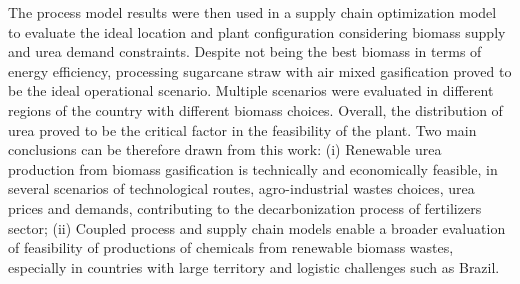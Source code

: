 \documentclass[a4paper, titlepage]{article}
\begin{document}
The process model results were then used in a supply chain optimization model to evaluate the ideal location and plant
configuration considering biomass supply and urea demand constraints. Despite not being the best biomass in terms of
energy efficiency, processing sugarcane straw with air mixed gasification proved to be the ideal operational scenario.
Multiple scenarios were evaluated in different regions of the country with different biomass choices. Overall, the
distribution of urea proved to be the critical factor in the feasibility of the plant. Two main conclusions can be
therefore drawn from this work: (i) Renewable urea production from biomass gasification is technically and economically
feasible, in several scenarios of technological routes, agro-industrial wastes choices, urea prices and demands,
contributing to the decarbonization process of fertilizers sector; (ii) Coupled process and supply chain models enable a
broader evaluation of feasibility of productions of chemicals from renewable biomass wastes, especially in countries
with large territory and logistic challenges such as Brazil.

\clearpage

\printbibliography{}
\end{document}
